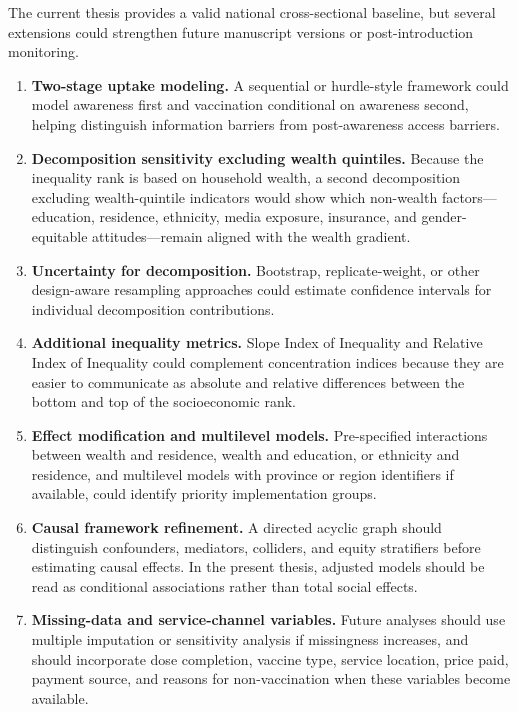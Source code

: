 The current thesis provides a valid national cross-sectional baseline, but several extensions could strengthen future manuscript versions or post-introduction monitoring.

\begin{enumerate}
    \item \textbf{Two-stage uptake modeling.} A sequential or hurdle-style framework could model awareness first and vaccination conditional on awareness second, helping distinguish information barriers from post-awareness access barriers.
    \item \textbf{Decomposition sensitivity excluding wealth quintiles.} Because the inequality rank is based on household wealth, a second decomposition excluding wealth-quintile indicators would show which non-wealth factors---education, residence, ethnicity, media exposure, insurance, and gender-equitable attitudes---remain aligned with the wealth gradient.
    \item \textbf{Uncertainty for decomposition.} Bootstrap, replicate-weight, or other design-aware resampling approaches could estimate confidence intervals for individual decomposition contributions.
    \item \textbf{Additional inequality metrics.} Slope Index of Inequality and Relative Index of Inequality could complement concentration indices because they are easier to communicate as absolute and relative differences between the bottom and top of the socioeconomic rank.
    \item \textbf{Effect modification and multilevel models.} Pre-specified interactions between wealth and residence, wealth and education, or ethnicity and residence, and multilevel models with province or region identifiers if available, could identify priority implementation groups.
    \item \textbf{Causal framework refinement.} A directed acyclic graph should distinguish confounders, mediators, colliders, and equity stratifiers before estimating causal effects. In the present thesis, adjusted models should be read as conditional associations rather than total social effects.
    \item \textbf{Missing-data and service-channel variables.} Future analyses should use multiple imputation or sensitivity analysis if missingness increases, and should incorporate dose completion, vaccine type, service location, price paid, payment source, and reasons for non-vaccination when these variables become available.
\end{enumerate}


